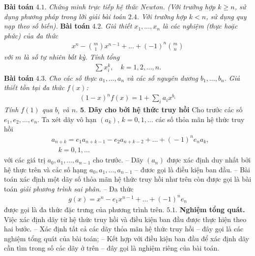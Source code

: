\begin{multicols}{2}
	\textbf{\color{hoccungpi}Bài toán} $\pmb{4.1.}$ \textit{ Chứng minh trực tiếp hệ thức Newton. 
			(Với trường hợp $k\geq n$, sử dụng phương pháp trong lời giải bài toán $2.4$. Với trường hợp $k<n$, sử dụng quy nạp theo số biến).}
	\vskip 0.1cm
	\textbf{\color{hoccungpi}Bài toán} $\pmb{4.2.}$  \textit{Giả thiết $x_1,\ldots,x_n$ là các nghiệm (thực hoặc phức) của đa thức
	\begin{align*}
		x^n-{m\choose 1}x^{n-1}+\ldots+(-1)^n{m\choose n}
	\end{align*}
	với $m$ là số tự nhiên bất kỳ.
	Tính tổng}
	\begin{align*}
		\sum x_i^k,\quad k=1,2,\ldots,n.
	\end{align*} 
	\textbf{\color{hoccungpi}Bài toán} $\pmb{4.3.}$
	\textit{Cho các số thực $a_1,\ldots,a_n$ và các số nguyên dương $b_1,\ldots,b_n$. Giả thiết tồn tại đa thức $f(x)$:
	\begin{align*}
		(1-x)^nf(x)=1+\sum_i a_ix^{b_i}
	\end{align*}
	Tính $f(1)$ qua $b_i$ và $n$.} 
	\vskip 0.1cm
	$\pmb{5.}$ \textbf{\color{hoccungpi}Dãy cho bởi hệ thức truy hồi}
	\vskip 0.1cm
	Cho trước các số $e_1,e_2,\ldots,e_n$. Ta xét dãy vô hạn $(a_k)$, $k=0,1,\ldots$ các số thỏa mãn {\color{blue} hệ thức truy hồi}
	\begin{align*}
		&a_{n\!+\!k}\!=\!e_1a_{n\!+\!k\!-\!1}\!-\!e_2a_{n\!+\!k\!-\!2}\!+\!\ldots\!+\!(\!-\!1)^{n}e_na_k,\\
		&\quad k=0, 1,\ldots
	\end{align*}
	với các giá trị  $a_0,a_1,\ldots,a_{n-1}$ cho trước. 
	\vskip 0.1cm	
	-- Dãy $(a_n)$ được xác định duy nhất bởi hệ thực trên và các số hạng
			$a_0, a_1,\ldots, a_{n-1}$ -- đươc gọi là {\color{blue}  điều kiện ban đầu}.
	\vskip 0.1cm  
	--	Bài toán xác định một dãy số thỏa mãn hệ thức truy hồi như trên còn được gọi là bài toán {\em giải phương trình sai phân}. 
	\vskip 0.1cm
	-- Đa thức 
	\begin{align*}
		g(x)=x^n-e_1x^{n-1}+\ldots+(-1)^n e_n
	\end{align*}
	được gọi là {\color{blue} đa thức đặc trưng} của phương trình trên.
	\vskip 0.1cm
	$\pmb{5.1.}$ \textbf{\color{hoccungpi}Nghiệm tổng quát.} 
	Việc xác định dãy từ hệ thức truy hồi và điều kiện ban đầu được thực hiện theo hai bước.
	\vskip 0.1cm
	--  Xác định tất cả các dãy thỏa mãn hệ thức truy hồi -- đây gọi là {\color{blue} các nghiệm tổng quát} của bài toán;
	\vskip 0.1cm
	--  Kết hợp với điều kiện ban đầu để xác định dãy cần tìm trong số các dãy ở trên -- đây gọi là {\color{blue} nghiệm riêng} của bài toán.

\end{multicols}
